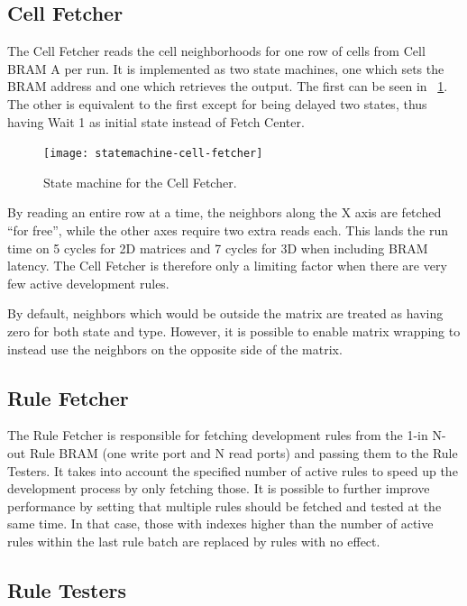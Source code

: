 \subsection{Cell Fetcher}

The Cell Fetcher reads the cell neighborhoods for one row of cells from Cell BRAM A per run.
It is implemented as two state machines, one which sets the BRAM address and one which retrieves the output.
The first can be seen in \figurename~\ref{fig:statemachine-cell-fetcher}.
The other is equivalent to the first except for being delayed two states, thus having Wait 1 as initial state instead of Fetch Center.

\begin{figure}[!ht]
    \centering
    \texttt{[image: statemachine-cell-fetcher]}
    \caption[Cell Fetcher state machine]{
        State machine for the Cell Fetcher.
    }
    \label{fig:statemachine-cell-fetcher}
\end{figure}

By reading an entire row at a time, the neighbors along the X axis are fetched ``for free'', while the other axes require two extra reads each.
This lands the run time on 5 cycles for 2D matrices and 7 cycles for 3D when including BRAM latency.
The Cell Fetcher is therefore only a limiting factor when there are very few active development rules.

By default, neighbors which would be outside the matrix are treated as having zero for both state and type.
However, it is possible to enable matrix wrapping to instead use the neighbors on the opposite side of the matrix.

\subsection{Rule Fetcher}

The Rule Fetcher is responsible for fetching development rules from the 1-in N-out Rule BRAM (one write port and N read ports) and passing them to the Rule Testers.
It takes into account the specified number of active rules to speed up the development process by only fetching those.
It is possible to further improve performance by setting that multiple rules should be fetched and tested at the same time.
In that case, those with indexes higher than the number of active rules within the last rule batch are replaced by rules with no effect.

\subsection{Rule Testers}

